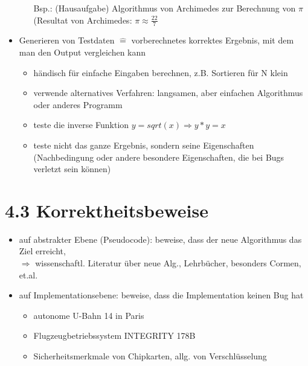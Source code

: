 \documentclass[11pt, fleqn]{scrreprt}
\begin{document}
\begin{itemize}
\begin{itemize}
			Bsp.: (Hausaufgabe) Algorithmus von Archimedes zur Berechnung von $\pi$\\ \hspace*{0,9cm}(Resultat von Archimedes: $\pi \approx \frac{22}{7}$
		\end{itemize}
		\item Generieren von Testdaten $\widehat{=}$ vorberechnetes korrektes Ergebnis, mit dem man den Output vergleichen kann
		\begin{itemize}
			\item händisch für einfache Eingaben berechnen, z.B. Sortieren für N klein
			\item verwende alternatives Verfahren: langsamen, aber einfachen Algorithmus oder anderes Programm
			\item teste die inverse Funktion $y = sqrt(x) \Rightarrow y*y = x$
			\item teste nicht das ganze Ergebnis, sondern seine Eigenschaften (Nachbedingung oder andere besondere Eigenschaften, die bei Bugs verletzt sein können)
		\end{itemize}
	\end{itemize}
	
	\section*{4.3 Korrektheitsbeweise}
	\begin{itemize}
		\item auf abstrakter Ebene (Pseudocode): beweise, dass der neue Algorithmus das Ziel erreicht, \\
		$\Rightarrow$ wissenschaftl. Literatur über neue Alg., Lehrbücher, besonders Cormen, et.al.
		\item auf Implementationsebene: beweise, dass die Implementation keinen Bug hat
		\begin{itemize}
			\item autonome U-Bahn 14 in Paris
			\item Flugzeugbetriebssystem INTEGRITY 178B
			\item Sicherheitsmerkmale von Chipkarten, allg. von Verschlüsselung
		\end{itemize}
	\end{itemize}
	
\end{document}
